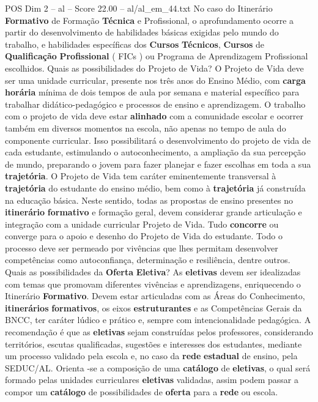 \begin{textsample}{POS Dim 2 – al – Score 22.00 – al/al\_em\_44.txt}
No caso do Itinerário \textbf{Formativo} de Formação \textbf{Técnica} e Profissional, o aprofundamento ocorre a partir do desenvolvimento de habilidades básicas exigidas pelo mundo do trabalho, e habilidades específicas dos \textbf{Cursos} \textbf{Técnicos}, \textbf{Cursos} de \textbf{Qualificação} \textbf{Profissional} ( FICs ) ou Programa de Aprendizagem Profissional escolhidos.
Quais as possibilidades do Projeto de Vida?
O Projeto de Vida deve ser uma unidade curricular, presente nos três anos do Ensino Médio, com \textbf{carga} \textbf{horária} mínima de dois tempos de aula por semana e material específico para trabalhar didático-pedagógico e processos de ensino e aprendizagem.
O trabalho com o projeto de vida deve estar \textbf{alinhado} com a comunidade escolar e ocorrer também em diversos momentos na escola, não apenas no tempo de aula do componente curricular.
Isso possibilitará o desenvolvimento do projeto de vida de cada estudante, estimulando o autoconhecimento, a ampliação da sua percepção de mundo, preparando o jovem para fazer planejar e fazer escolhas em toda a sua \textbf{trajetória}.
O Projeto de Vida tem caráter eminentemente transversal à \textbf{trajetória} do estudante do ensino médio, bem como à \textbf{trajetória} já construída na educação básica.
Neste sentido, todas as propostas de ensino presentes no \textbf{itinerário} \textbf{formativo} e formação geral, devem considerar grande articulação e integração com a unidade curricular Projeto de Vida.
Tudo \textbf{concorre} ou converge para o apoio e desenho do Projeto de Vida do estudante.
Todo o processo deve ser permeado por vivências que lhes permitam desenvolver competências como autoconfiança, determinação e resiliência, dentre outros.
Quais as possibilidades da \textbf{Oferta} \textbf{Eletiva}?
As \textbf{eletivas} devem ser idealizadas com temas que promovam diferentes vivências e aprendizagens, enriquecendo o Itinerário \textbf{Formativo}.
Devem estar articuladas com as Áreas do Conhecimento, \textbf{itinerários} \textbf{formativos}, os eixos \textbf{estruturantes} e as Competências Gerais da BNCC, ter caráter lúdico e prático e, sempre com intencionalidade pedagógica.
A recomendação é que as \textbf{eletivas} sejam construídas pelos professores, considerando territórios, escutas qualificadas, sugestões e interesses dos estudantes, mediante um processo validado pela escola e, no caso da \textbf{rede} \textbf{estadual} de ensino, pela SEDUC/AL.
Orienta -se a composição de uma \textbf{catálogo} de \textbf{eletivas}, o qual será formado pelas unidades curriculares \textbf{eletivas} validadas, assim podem passar a compor um \textbf{catálogo} de possibilidades de \textbf{oferta} para a \textbf{rede} ou escola.

\end{textsample}
